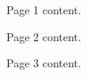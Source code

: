 \documentclass{article}
\begin{document}
Page 1 content.

\newpage

Page 2 content.

\newpage

Page 3 content.
\end{document}
